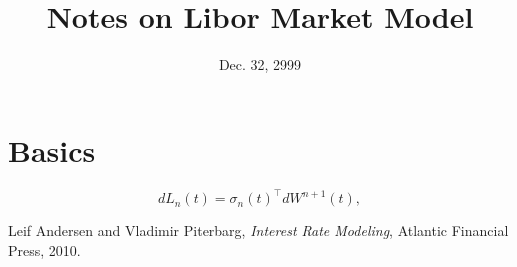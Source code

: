 \documentclass[12pt]{article}
\begin{document}
\title{Notes on Libor Market Model}
\date{Dec. 32, 2999}

\maketitle

\section{Basics}

  \begin{equation}
    dL_n(t) = \sigma_n(t)^{\top}dW^{n+1}(t),
  \end{equation}

\begin{thebibliography}{99}

   Leif Andersen and Vladimir Piterbarg, {\it Interest Rate Modeling}, Atlantic Financial Press, 2010.

\end{thebibliography}
\end{document}
